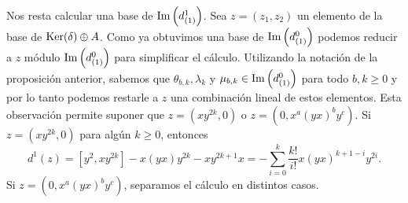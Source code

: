 \documentclass[fleqn,../tesis.tex]{subfiles}
\begin{document}
Nos resta calcular una base de $\operatorname{Im}\left(d^{1}_{(1)}\right)$. Sea $z = (z_1, z_2)$ un elemento de la base de $\operatorname{Ker}(\delta) \oplus A$.
Como ya obtuvimos una base de $\operatorname{Im}\left(d^{0}_{(1)}\right)$ podemos reducir a $z$ módulo $\operatorname{Im}\left(d^{0}_{(1)}\right)$ para simplificar el cálculo. Utilizando la notación de la proposición anterior, 
sabemos que $\theta_{b, k}, \lambda_k$ y $\mu_{b, k} \in \operatorname{Im}\left(d^{0}_{(1)}\right)$ para todo $b, k \geq 0$ y por lo tanto podemos
restarle a $z$ una combinación lineal de estos elementos. Esta observación permite suponer que $z = (xy^{2k}, 0)$ o 
$z = (0, x^{a}(yx)^{b}y^{c})$. Si $z = (xy^{2k}, 0)$ para algún $k \geq 0$, entonces
\[
    d^1(z) = \left[y^{2}, xy^{2k}\right] - x(yx)y^{2k} - xy^{2k + 1}x = -\sum_{i = 0}^{k}\frac{k!}{i!}x(yx)^{k + 1- i}y^{2i}.
\]
Si $z = (0, x^{a}(yx)^{b}y^{c})$, separamos el cálculo en distintos casos.
\end{document}
